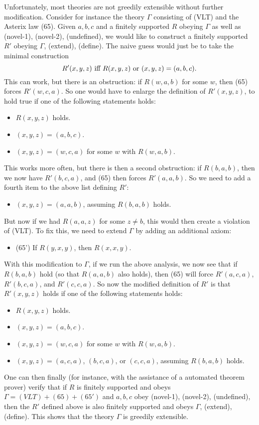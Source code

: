 Unfortunately, most theories are not greedily extensible without further modification.  Consider for instance the theory $\Gamma$ consisting of (VLT) and the Asterix law (65).  Given $a,b,c$ and a finitely supported $R$ obeying $\Gamma$ as well as (novel-1), (novel-2), (undefined), we would like to construct a finitely supported  $R'$ obeying $\Gamma$, (extend), (define).  The naive guess would just be to take the minimal construction
$$ R'(x,y,z) \hbox{ iff } R(x,y,z) \hbox{ or } (x,y,z) = (a,b,c).$$
This can work, but there is an obstruction: if $R(w,a,b)$ for some $w$, then (65) forces $R'(w,c,a)$.  So one would have to enlarge the definition of $R'(x,y,z)$, to hold true if one of the following statements holds:
\begin{itemize}
  \item $R(x,y,z)$ holds.
  \item $(x,y,z) = (a,b,c)$.
  \item $(x,y,z) = (w,c,a)$ for some $w$ with $R(w,a,b)$.
\end{itemize}
This works more often, but there is then a second obstruction: if $R(b,a,b)$, then we now have $R'(b,c,a)$, and (65) then forces $R'(a,a,b)$.  So we need to add a fourth item to the above list defining $R'$:
\begin{itemize}
  \item $(x,y,z) = (a,a,b)$, assuming $R(b,a,b)$ holds.
\end{itemize}
But now if we had $R(a,a,z)$ for some $z \neq b$, this would then create a violation of (VLT).  To fix this, we need to extend $\Gamma$ by adding an additional axiom:
\begin{itemize}
  \item (65') If $R(y,x,y)$, then $R(x,x,y)$.
\end{itemize}
With this modification to $\Gamma$, if we run the above analysis, we now see that if $R(b,a,b)$ hold (so that $R(a,a,b)$ also holds), then (65) will force $R'(a,c,a)$, $R'(b,c,a)$, and $R'(c,c,a)$.  So now the modified definition of $R'$ is that $R'(x,y,z)$ holds if one of the following statements holds:
\begin{itemize}
  \item $R(x,y,z)$ holds.
  \item $(x,y,z) = (a,b,c)$.
  \item $(x,y,z) = (w,c,a)$ for some $w$ with $R(w,a,b)$.
  \item $(x,y,z) = (a,c,a)$, $(b,c,a)$, or $(c,c,a)$, assuming $R(b,a,b)$ holds.
\end{itemize}
One can then finally (for instance, with the assistance of a automated theorem prover) verify that if $R$ is finitely supported and obeys $\Gamma = (VLT) + (65) + (65')$ and $a,b,c$ obey (novel-1), (novel-2), (undefined), then the $R'$ defined above is also finitely supported and obeys $\Gamma$, (extend), (define).  This shows that the theory $\Gamma$ is greedily extensible.

